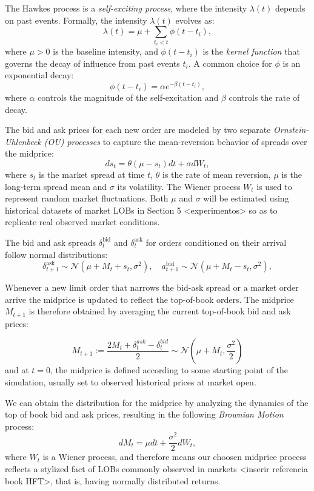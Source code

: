The Hawkes process is a \textit{self-exciting process}, where the intensity \( \lambda(t) \) depends on past events. Formally, the intensity \( \lambda(t) \) evolves as:
$$
\lambda(t) = \mu + \sum_{t_i < t} \phi(t - t_i),
$$
where \( \mu > 0 \) is the baseline intensity, and \( \phi(t - t_i) \) is the \textit{kernel function} that governs the decay of influence from past events \( t_i \). A common choice for \( \phi \) is an exponential decay:
$$
\phi(t - t_i) = \alpha e^{-\beta (t - t_i)},
$$
where $\alpha$ controls the magnitude of the self-excitation and \( \beta \) controls the rate of decay.

The bid and ask prices for each new order are modeled by two separate \textit{Ornstein-Uhlenbeck (OU) processes} to capture the mean-reversion behavior of spreads over the midprice:
$$
ds_t = \theta(\mu - s_t) dt + \sigma dW_t,
$$
where $s_t$ is the market spread at time $t$, $\theta$ is the rate of mean reversion, $\mu$ is the long-term spread mean and $\sigma$ its volatility. The Wiener process $W_t$ is used to represent random market fluctuations. Both $\mu$ and $\sigma$ will be estimated using historical datasets of market LOBs in Section 5 <experimentos> so as to replicate real observed market conditions.

The bid and ask spreads $\delta_t^{\text{bid}}$ and $ \delta_t^{\text{ask}}$ for orders conditioned on their arrival follow normal distributions:
$$
\delta_{t+1}^{\text{ask}} \sim \mathcal{N}(\mu + M_{t} + s_t, \sigma^2), \quad a_{t+1}^{\text{bid}} \sim \mathcal{N}(\mu + M_{t} - s_t, \sigma^2),
$$

Whenever a new limit order that narrows the bid-ask spread or a market order arrive the midprice is updated to reflect the top-of-book orders. The midprice $M_{t+1}$ is therefore obtained by averaging the current top-of-book bid and ask prices:

$$
M_{t+1} := \frac{2M_t + \delta^{ask}_{t} - \delta^{bid}_{t}}{2} 
\sim \mathcal{N}(\mu + M_{t}, \frac{\sigma^2}{2})
$$ and at $t = 0$, the midprice is defined according to some starting point of the simulation, usually set to observed historical prices at market open.

We can obtain the distribution for the midprice by analyzing the dynamics of the top of book bid and ask prices, resulting in the following \textit{Brownian Motion} process:
$$
dM_t = \mu dt + \frac{\sigma^2}{2} dW_t,
$$
where \( W_t \) is a Wiener process, and therefore means our choosen midprice process reflects a stylized fact of LOBs commonly observed in markets <inserir referencia book HFT>, that is, having normally distributed returns.

